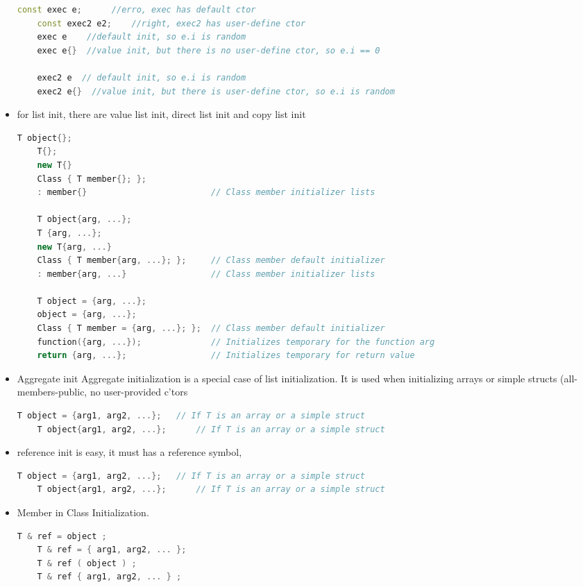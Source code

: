 \documentclass[a4paper,12pt,twoside]{book}
\begin{document}
\begin{itemize}
\begin{lstlisting}[frame=single, language=c++]
	const exec e;      //erro, exec has default ctor
	const exec2 e2;    //right, exec2 has user-define ctor
	exec e    //default init, so e.i is random
	exec e{}  //value init, but there is no user-define ctor, so e.i == 0
	
	exec2 e  // default init, so e.i is random
	exec2 e{}  //value init, but there is user-define ctor, so e.i is random
	\end{lstlisting}
	
	\item for list init, there are value list init, direct list init and copy list init
	\begin{lstlisting}[frame=single, language=c++]
	T object{};
	T{};
	new T{}
	Class { T member{}; };
	: member{}                         // Class member initializer lists
	
	T object{arg, ...};
	T {arg, ...};
	new T{arg, ...}
	Class { T member{arg, ...}; };     // Class member default initializer
	: member{arg, ...}                 // Class member initializer lists
	
	T object = {arg, ...};
	object = {arg, ...};
	Class { T member = {arg, ...}; };  // Class member default initializer
	function({arg, ...});              // Initializes temporary for the function arg
	return {arg, ...};                 // Initializes temporary for return value
	\end{lstlisting}
	
	\item Aggregate init Aggregate initialization is a special case of list initialization. It is used when initializing arrays or simple structs (all-members-public, no user-provided c'tors
	\begin{lstlisting}[frame=single, language=c++]
	T object = {arg1, arg2, ...};   // If T is an array or a simple struct
	T object{arg1, arg2, ...};      // If T is an array or a simple struct
	\end{lstlisting}
	
	\item reference init is easy, it must has a reference symbol, 
	\begin{lstlisting}[frame=single, language=c++]
	T object = {arg1, arg2, ...};   // If T is an array or a simple struct
	T object{arg1, arg2, ...};      // If T is an array or a simple struct
	\end{lstlisting}
	
	\item Member in Class Initialization.
	\begin{lstlisting}[frame=single, language=c++]
	T & ref = object ;
	T & ref = { arg1, arg2, ... };
	T & ref ( object ) ;
	T & ref { arg1, arg2, ... } ;
	\end{lstlisting}
	

\end{itemize}
\end{document}
